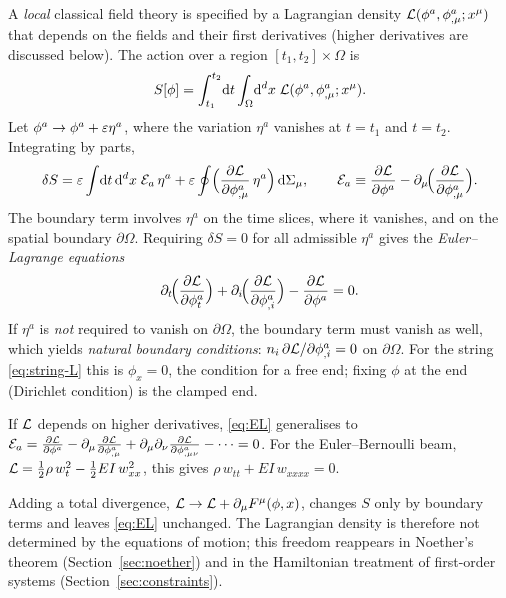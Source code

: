 A \emph{local} classical field theory is specified by a Lagrangian density
$\mathcal{L}(\phi^a,\phi^a_{,\mu};x^\mu)$ that depends on the fields and their first
derivatives (higher derivatives are discussed below). The action over a region
$[t_1,t_2]\times\Omega$ is
\begin{equation}
  S[\phi]=\int_{t_1}^{t_2}\!\mathrm{d} t\int_\Omega\!\mathrm{d}^dx\;\mathcal{L}(\phi^a,\phi^a_{,\mu};x^\mu).
  \label{eq:action}
\end{equation}
Let $\phi^a\to\phi^a+\varepsilon\eta^a$, where the variation $\eta^a$ vanishes at
$t=t_1$ and $t=t_2$. Integrating by parts,
\begin{equation}
  \delta S=\varepsilon\int\!\mathrm{d} t\,\mathrm{d}^dx\;\mathcal{E}_a\,\eta^a
  +\varepsilon\oint\!\Big(\frac{\partial \mathcal{L}}{\partial \phi^a_{,\mu}}\,\eta^a\Big)\,\mathrm{d}\Sigma_\mu ,
  \qquad
  \mathcal{E}_a\equiv\frac{\partial \mathcal{L}}{\partial \phi^a}-\partial_\mu\!\Big(\frac{\partial \mathcal{L}}{\partial \phi^a_{,\mu}}\Big).
  \label{eq:variation}
\end{equation}
The boundary term involves $\eta^a$ on the time slices, where it vanishes, and
on the spatial boundary $\partial\Omega$. Requiring $\delta S=0$ for all
admissible $\eta^a$ gives the \emph{Euler--Lagrange equations}
\begin{equation}
  \partial_t\!\Big(\frac{\partial \mathcal{L}}{\partial \phi^a_t}\Big)+\partial_i\!\Big(\frac{\partial \mathcal{L}}{\partial \phi^a_{,i}}\Big)-\frac{\partial \mathcal{L}}{\partial \phi^a}=0 .
  \label{eq:EL}
\end{equation}
If $\eta^a$ is \emph{not} required to vanish on $\partial\Omega$, the
boundary term must vanish as well, which yields \emph{natural boundary
conditions}: $n_i\,\partial\mathcal{L}/\partial\phi^a_{,i}=0$ on $\partial\Omega$. For
the string \eqref{eq:string-L} this is $\phi_x=0$, the condition for a free end;
fixing $\phi$ at the end (Dirichlet condition) is the clamped end.

If $\mathcal{L}$ depends on higher derivatives, \eqref{eq:EL} generalises to
$\mathcal{E}_a=\frac{\partial \mathcal{L}}{\partial \phi^a}-\partial_\mu\frac{\partial \mathcal{L}}{\partial \phi^a_{,\mu}}
+\partial_\mu\partial_\nu\frac{\partial \mathcal{L}}{\partial \phi^a_{,\mu\nu}}-\dots=0$. For the
Euler--Bernoulli beam, $\mathcal{L}=\tfrac12\rho\,w_t^2-\tfrac12 EI\,w_{xx}^2$, this gives
$\rho\,w_{tt}+EI\,w_{xxxx}=0$.

\begin{remark}
Adding a total divergence, $\mathcal{L}\to\mathcal{L}+\partial_\mu F^\mu(\phi,x)$, changes
$S$ only by boundary terms and leaves \eqref{eq:EL} unchanged. The Lagrangian
density is therefore not determined by the equations of motion; this freedom
reappears in Noether's theorem (Section~\ref{sec:noether}) and in the
Hamiltonian treatment of first-order systems (Section~\ref{sec:constraints}).
\end{remark}

